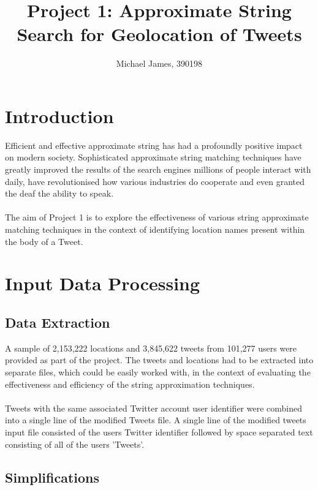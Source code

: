 \documentclass[11pt,a4paper]{article}
\author{Michael James, 390198}
\begin{document}
\title{Project 1: Approximate String Search for Geolocation of Tweets}
\maketitle

\section{Introduction}
Efficient and effective approximate string has had a profoundly positive impact on modern society. Sophisticated approximate string matching techniques have greatly improved the results of the search engines millions of people interact with daily, have revolutionised how various industries do cooperate and even granted the deaf the ability to speak.\\\\
The aim of Project 1 is to explore the effectiveness of various string approximate matching techniques in the context of identifying location names present within the body of a Tweet.

\section{Input Data Processing}  

\subsection{Data Extraction}

A sample of 2,153,222 locations and 3,845,622 tweets from 101,277 users were provided as part of the project. The tweets and locations had to be extracted into separate files, which could be easily worked with, in the context of evaluating the effectiveness and efficiency of the string approximation techniques.\\\\
Tweets with the same associated Twitter account user identifier were combined into a single line of the modified Tweets file. A single line of the modified tweets input file consisted of the users Twitter identifier followed by space separated text consisting of all of the users 'Tweets'.  

\subsection{Simplifications}
\end{document}
